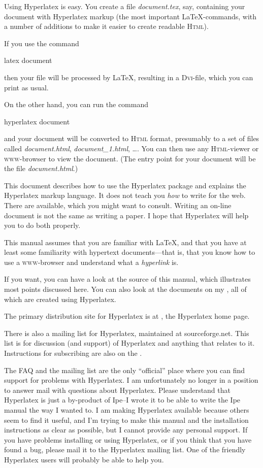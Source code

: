 \documentclass{article}
\newcommand{\homepage}{http://www.cs.ust.hk/\~{}otfried/}
\newcommand{\+}{\verb+}
\renewcommand{\*}{\back{}}
\newcommand{\Html}{\textsc{Html}\xspace }
\newcommand{\latex}{\LaTeX\xspace }
\newcommand{\dvi}{\textsc{Dvi}\xspace }
\begin{document}
Using Hyperlatex is easy. You create a file \textit{document.tex},
say, containing your document with Hyperlatex markup (the most
important \latex-commands, with a number of additions to make it
easier to create readable \Html).

If you use the command
\begin{example}
  latex document
\end{example}
then your file will be processed by \latex, resulting in a
\dvi-file, which you can print as usual.

On the other hand, you can run the command
\begin{example}
  hyperlatex document
\end{example}
and your document will be converted to \Html format, presumably to a
set of files called \textit{document.html}, \textit{document\_1.html},
\ldots{}. You can then use any \Html-viewer or \textsc{www}-browser to
view the document.  (The entry point for your document will be the
file \textit{document.html}.)

This document describes how to use the Hyperlatex package and explains
the Hyperlatex markup language. It does not teach you {\em how} to
write for the web. There are 
available, which you might want to consult. Writing an on-line
document is not the same as writing a paper. I hope that Hyperlatex
will help you to do both properly.

This manual assumes that you are familiar with \latex, and that you
have at least some familiarity with hypertext documents---that is,
that you know how to use a \textsc{www}-browser and understand what a
\emph{hyperlink} is.

If you want, you can have a look at the source of this manual, which
illustrates most points discussed here. You can also look at the
documents on my \xlink{home page}{\homepage}, all of which are created
using Hyperlatex. 

The primary distribution site for Hyperlatex is at
,
the Hyperlatex home page.

There is also a mailing list for Hyperlatex, maintained at
sourceforge.net.  This list is for discussion (and support) of Hyperlatex and
anything that relates to it.  Instructions for subscribing are also on
the .

The FAQ and the mailing list are the only ``official'' place where you
can find support for problems with Hyperlatex.  I am unfortunately no
longer in a position to answer mail with questions about Hyperlatex.
Please understand that Hyperlatex is just a by-product of Ipe--I wrote
it to be able to write the Ipe manual the way I wanted to. I am making
Hyperlatex available because others seem to find it useful, and I'm
trying to make this manual and the installation instructions as clear
as possible, but I cannot provide any personal support.  If you have
problems installing or using Hyperlatex, or if you think that you have
found a bug, please mail it to the Hyperlatex mailing list.
One of the friendly Hyperlatex users will probably be able to help
you.
\end{document}

